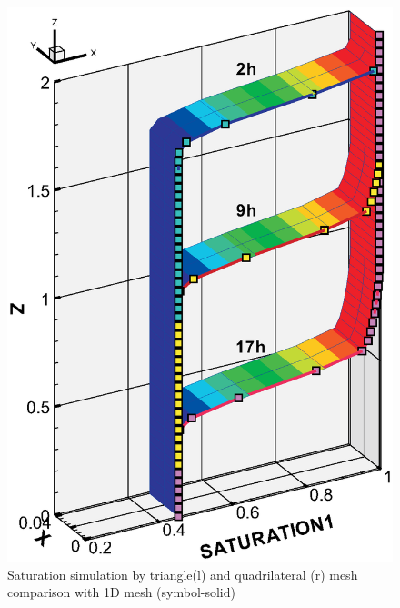 \begin{figure}[h]
\begin{minipage}[t]{5.5cm}
\begin{picture}
\includegraphics[height=1.2\columnwidth, angle=0]{H_US/figures/result_warrick_quad.eps}
\end{picture}
\end{minipage}
\caption{Saturation simulation by triangle(l) and quadrilateral
(r) mesh comparison with 1D mesh (symbol-solid)}
\label{us:result-warrick2D}
\end{figure}
